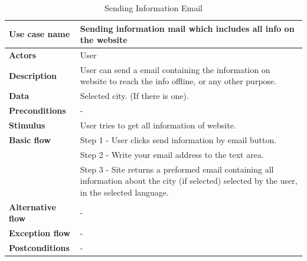 \begin{center}
    \begin{table}[H]
        \begin{tabular}{| m{3cm}| m{10cm} |}
            \hline
            \textbf{Use case name} & Sending information mail which includes all info on the website\\
            \hline
            \textbf{Actors} & User\\
            \hline
            \textbf{Description} & User can send a email containing the information on website to reach the info offline, or any other purpose.\\
            \hline
            \textbf{Data} & Selected city. (If there is one).\\
            \hline
            \textbf{Preconditions} & - \\
            \hline
            \textbf{Stimulus} & User tries to get all information of website.\\
            \hline
            \textbf{Basic flow} & Step 1 - User clicks send information by email button.\\
                                & Step 2 - Write your email address to the text area. \\
                                & Step 3 - Site returns a preformed email containing all information about the city (if selected) selected by the user, in the selected language. \\
            \hline
            \textbf{Alternative flow} & - \\
            \hline
            \textbf{Exception flow} & - \\
            \hline
            \textbf{Postconditions} & - \\
            \hline
        \end{tabular}
        \caption[Sending Information Email]{Sending Information Email}
    \end{table}
\end{center}

